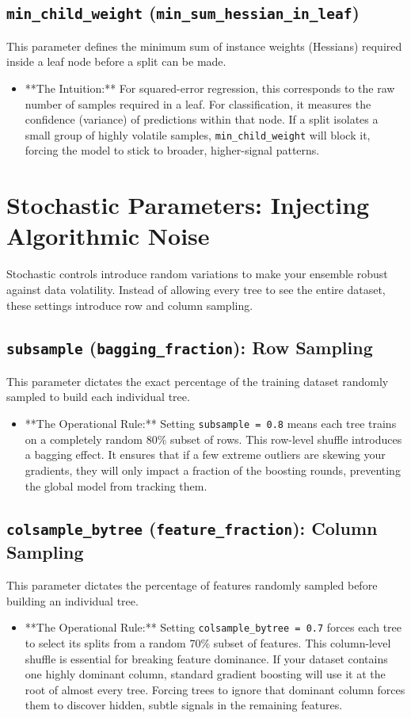 \documentclass{article}
\begin{document}
\subsection{\texttt{min\_child\_weight} (\texttt{min\_sum\_hessian\_in\_leaf})}
This parameter defines the minimum sum of instance weights (Hessians) required inside a leaf node before a split can be made.
\begin{itemize}
    \item **The Intuition:** For squared-error regression, this corresponds to the raw number of samples required in a leaf. For classification, it measures the confidence (variance) of predictions within that node. If a split isolates a small group of highly volatile samples, \texttt{min\_child\_weight} will block it, forcing the model to stick to broader, higher-signal patterns.
\end{itemize}

\section{Stochastic Parameters: Injecting Algorithmic Noise}
Stochastic controls introduce random variations to make your ensemble robust against data volatility. Instead of allowing every tree to see the entire dataset, these settings introduce row and column sampling.

\subsection{\texttt{subsample} (\texttt{bagging\_fraction}): Row Sampling}
This parameter dictates the exact percentage of the training dataset randomly sampled to build each individual tree.
\begin{itemize}
    \item **The Operational Rule:** Setting \texttt{subsample = 0.8} means each tree trains on a completely random 80\% subset of rows. This row-level shuffle introduces a bagging effect. It ensures that if a few extreme outliers are skewing your gradients, they will only impact a fraction of the boosting rounds, preventing the global model from tracking them.
\end{itemize}

\subsection{\texttt{colsample\_bytree} (\texttt{feature\_fraction}): Column Sampling}
This parameter dictates the percentage of features randomly sampled before building an individual tree.
\begin{itemize}
    \item **The Operational Rule:** Setting \texttt{colsample\_bytree = 0.7} forces each tree to select its splits from a random 70\% subset of features. This column-level shuffle is essential for breaking feature dominance. If your dataset contains one highly dominant column, standard gradient boosting will use it at the root of almost every tree. Forcing trees to ignore that dominant column forces them to discover hidden, subtle signals in the remaining features.
\end{itemize}
\end{document}
